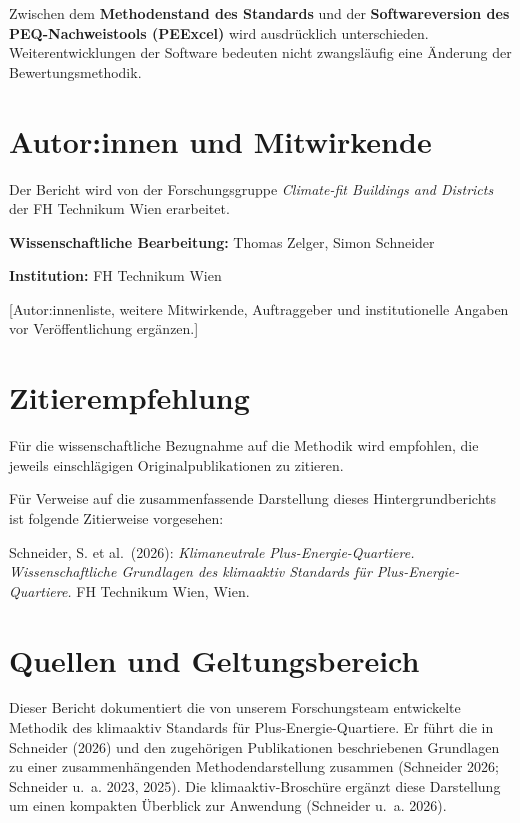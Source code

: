 \documentclass[
  ngerman,
  a4paper,
  DIV=11]{scrreprt}
\begin{document}
Zwischen dem \textbf{Methodenstand des Standards} und der
\textbf{Softwareversion des PEQ-Nachweistools (PEExcel)} wird
ausdrücklich unterschieden. Weiterentwicklungen der Software bedeuten
nicht zwangsläufig eine Änderung der Bewertungsmethodik.

\section*{Autor:innen und Mitwirkende}\label{autorinnen-und-mitwirkende}


Der Bericht wird von der Forschungsgruppe \emph{Climate-fit Buildings
and Districts} der FH Technikum Wien erarbeitet.

\textbf{Wissenschaftliche Bearbeitung:} Thomas Zelger, Simon Schneider

\textbf{Institution:} FH Technikum Wien

{[}Autor:innenliste, weitere Mitwirkende, Auftraggeber und
institutionelle Angaben vor Veröffentlichung ergänzen.{]}

\section*{Zitierempfehlung}\label{zitierempfehlung}


Für die wissenschaftliche Bezugnahme auf die Methodik wird empfohlen,
die jeweils einschlägigen Originalpublikationen zu zitieren.

Für Verweise auf die zusammenfassende Darstellung dieses
Hintergrundberichts ist folgende Zitierweise vorgesehen:

Schneider, S. et al.~(2026): \emph{Klimaneutrale Plus-Energie-Quartiere.
Wissenschaftliche Grundlagen des klimaaktiv Standards für
Plus-Energie-Quartiere.} FH Technikum Wien, Wien.

\section*{Quellen und
Geltungsbereich}\label{quellen-und-geltungsbereich}


Dieser Bericht dokumentiert die von unserem Forschungsteam entwickelte
Methodik des klimaaktiv Standards für Plus-Energie-Quartiere. Er führt
die in Schneider (2026) und den zugehörigen Publikationen beschriebenen
Grundlagen zu einer zusammenhängenden Methodendarstellung zusammen
(Schneider 2026; Schneider u.~a. 2023, 2025). Die klimaaktiv-Broschüre
ergänzt diese Darstellung um einen kompakten Überblick zur Anwendung
(Schneider u.~a. 2026).
\end{document}
